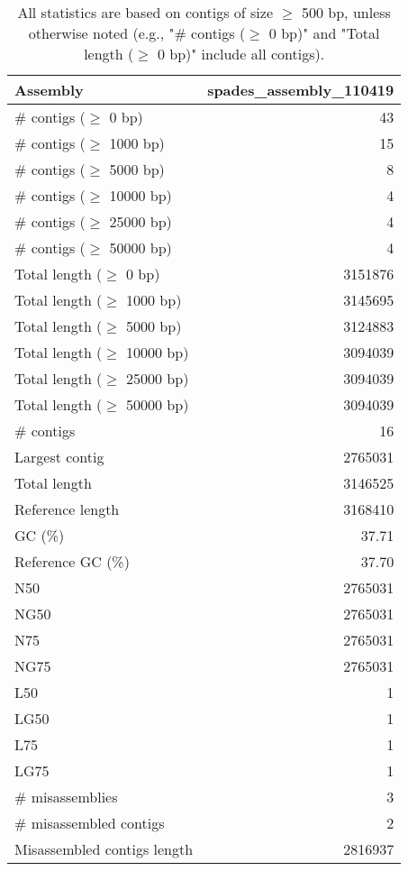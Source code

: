 \documentclass[12pt,a4paper]{article}
\begin{document}
\begin{table}[ht]
\begin{center}
\caption{All statistics are based on contigs of size $\geq$ 500 bp, unless otherwise noted (e.g., "\# contigs ($\geq$ 0 bp)" and "Total length ($\geq$ 0 bp)" include all contigs).}
\begin{tabular}{|l*{1}{|r}|}
\hline
Assembly & spades\_assembly\_110419 \\ \hline
\# contigs ($\geq$ 0 bp) & 43 \\ \hline
\# contigs ($\geq$ 1000 bp) & 15 \\ \hline
\# contigs ($\geq$ 5000 bp) & 8 \\ \hline
\# contigs ($\geq$ 10000 bp) & 4 \\ \hline
\# contigs ($\geq$ 25000 bp) & 4 \\ \hline
\# contigs ($\geq$ 50000 bp) & 4 \\ \hline
Total length ($\geq$ 0 bp) & 3151876 \\ \hline
Total length ($\geq$ 1000 bp) & 3145695 \\ \hline
Total length ($\geq$ 5000 bp) & 3124883 \\ \hline
Total length ($\geq$ 10000 bp) & 3094039 \\ \hline
Total length ($\geq$ 25000 bp) & 3094039 \\ \hline
Total length ($\geq$ 50000 bp) & 3094039 \\ \hline
\# contigs & 16 \\ \hline
Largest contig & 2765031 \\ \hline
Total length & 3146525 \\ \hline
Reference length & 3168410 \\ \hline
GC (\%) & 37.71 \\ \hline
Reference GC (\%) & 37.70 \\ \hline
N50 & 2765031 \\ \hline
NG50 & 2765031 \\ \hline
N75 & 2765031 \\ \hline
NG75 & 2765031 \\ \hline
L50 & 1 \\ \hline
LG50 & 1 \\ \hline
L75 & 1 \\ \hline
LG75 & 1 \\ \hline
\# misassemblies & 3 \\ \hline
\# misassembled contigs & 2 \\ \hline
Misassembled contigs length & 2816937 \\ \hline

\end{tabular}
\end{center}
\end{table}
\end{document}

